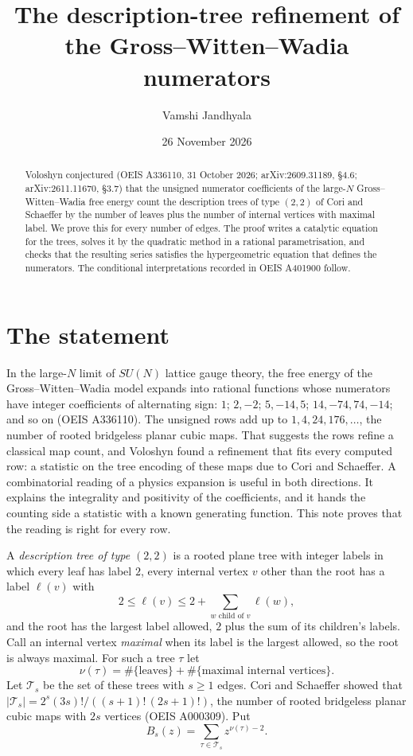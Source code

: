 \documentclass[11pt]{amsart}
\title{The description-tree refinement of the Gross--Witten--Wadia numerators}
\author{Vamshi Jandhyala}
\date{26 November 2026}
\theoremstyle{remark}
\begin{document}
\begin{abstract}
Voloshyn conjectured (OEIS A336110, 31 October 2026; arXiv:2609.31189, \S4.6; arXiv:2611.11670, \S3.7) that the
unsigned numerator coefficients of the large-$N$ Gross--Witten--Wadia free energy count the description trees of
type $(2,2)$ of Cori and Schaeffer by the number of leaves plus the number of internal vertices with maximal label.
We prove this for every number of edges. The proof writes a catalytic equation for the trees, solves it by the
quadratic method in a rational parametrisation, and checks that the resulting series satisfies the hypergeometric
equation that defines the numerators. The conditional interpretations recorded in OEIS A401900 follow.
\end{abstract}
\maketitle

\section{The statement}

In the large-$N$ limit of $SU(N)$ lattice gauge theory, the free energy of the Gross--Witten--Wadia model expands
into rational functions whose numerators have integer coefficients of alternating sign: $1$; $2,-2$; $5,-14,5$;
$14,-74,74,-14$; and so on (OEIS A336110). The unsigned rows add up to $1, 4, 24, 176, \dots$, the number of rooted
bridgeless planar cubic maps. That suggests the rows refine a classical map count, and Voloshyn found a refinement
that fits every computed row: a statistic on the tree encoding of these maps due to Cori and Schaeffer. A
combinatorial reading of a physics expansion is useful in both directions. It explains the integrality and
positivity of the coefficients, and it hands the counting side a statistic with a known generating function. This
note proves that the reading is right for every row.

A \emph{description tree of type $(2,2)$} \cite{CS} is a rooted plane tree with integer labels in which every leaf
has label $2$, every internal vertex $v$ other than the root has a label $\ell(v)$ with
\[
  2 \le \ell(v) \le 2 + \sum_{w \text{ child of } v} \ell(w),
\]
and the root has the largest label allowed, $2$ plus the sum of its children's labels. Call an internal vertex
\emph{maximal} when its label is the largest allowed, so the root is always maximal. For such a tree $\tau$ let
\[
  \nu(\tau) = \#\{\text{leaves}\} + \#\{\text{maximal internal vertices}\}.
\]
Let $\mathcal T_s$ be the set of these trees with $s \ge 1$ edges. Cori and Schaeffer showed that
$|\mathcal T_s| = 2^s(3s)!/((s+1)!\,(2s+1)!)$, the number of rooted bridgeless planar cubic maps with $2s$ vertices
(OEIS A000309). Put
\[
  B_s(z) = \sum_{\tau \in \mathcal T_s} z^{\nu(\tau)-2}.
\]
\end{document}
